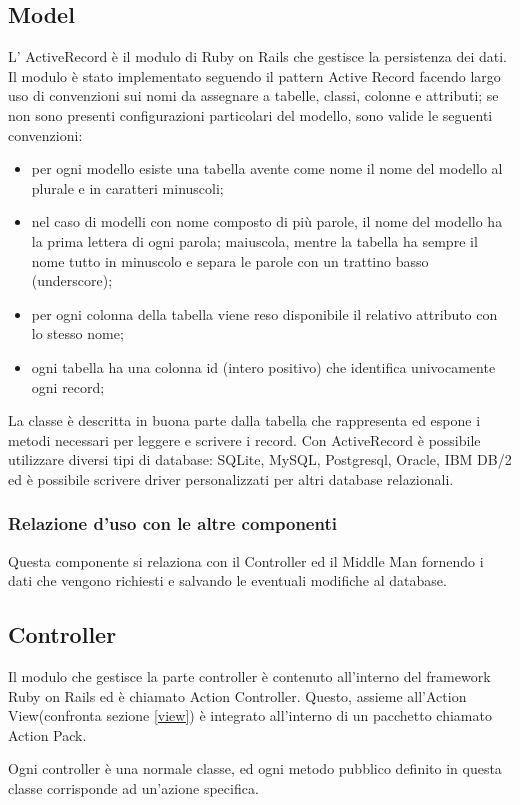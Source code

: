 \documentclass[11pt,a4paper]{article}
\begin{document}
\subsection{Model}
L' ActiveRecord è il modulo di Ruby on Rails che gestisce la persistenza dei dati. 
Il modulo è stato implementato seguendo il pattern Active Record facendo largo uso di convenzioni sui nomi da assegnare a tabelle, classi, colonne e attributi; se non sono presenti configurazioni particolari del modello, sono valide le seguenti convenzioni:
\begin{itemize}
 \item per ogni modello esiste una tabella avente come nome il nome del modello al plurale e in caratteri minuscoli;
\item nel caso di modelli con nome composto di più parole, il nome del modello ha la prima lettera di ogni parola; maiuscola, mentre la tabella ha sempre il nome tutto in minuscolo e separa le parole con un trattino basso (underscore);
\item per ogni colonna della tabella viene reso disponibile il relativo attributo con lo stesso nome;
\item ogni tabella ha una colonna id (intero positivo) che identifica univocamente ogni record;
\end{itemize}
La classe è descritta in buona parte dalla tabella che rappresenta ed espone i metodi necessari per leggere e scrivere i record.
Con ActiveRecord è possibile utilizzare diversi tipi di database: SQLite, MySQL, Postgresql, Oracle, IBM DB/2 ed è possibile scrivere driver personalizzati per altri database relazionali.
\subsubsection{Relazione d'uso con le altre componenti}
Questa componente si relaziona con il Controller ed il Middle Man fornendo i dati che vengono richiesti e salvando le eventuali modifiche al database.
\subsection{Controller}
Il modulo che gestisce la parte controller è contenuto all'interno del framework Ruby on Rails ed è chiamato Action Controller.
Questo, assieme all'Action View(confronta sezione \ref{view}) è integrato all'interno di un pacchetto chiamato Action Pack.

Ogni controller è una normale classe, ed ogni metodo pubblico definito in questa classe corrisponde ad un'azione specifica.
\end{document}
